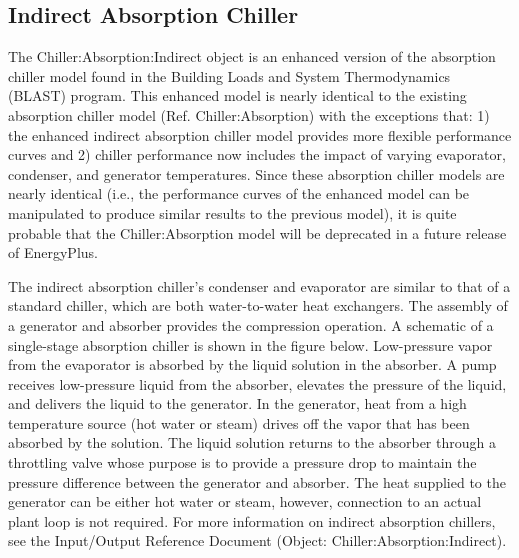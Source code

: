 \subsection{Indirect Absorption Chiller}\label{indirect-absorption-chiller}

The Chiller:Absorption:Indirect object is an enhanced version of the absorption chiller model found in the Building Loads and System Thermodynamics (BLAST) program. This enhanced model is nearly identical to the existing absorption chiller model (Ref. Chiller:Absorption) with the exceptions that: 1) the enhanced indirect absorption chiller model provides more flexible performance curves and 2) chiller performance now includes the impact of varying evaporator, condenser, and generator temperatures. Since these absorption chiller models are nearly identical (i.e., the performance curves of the enhanced model can be manipulated to produce similar results to the previous model), it is quite probable that the Chiller:Absorption model will be deprecated in a future release of EnergyPlus.

The indirect absorption chiller's condenser and evaporator are similar to that of a standard chiller, which are both water-to-water heat exchangers. The assembly of a generator and absorber provides the compression operation. A schematic of a single-stage absorption chiller is shown in the figure below. Low-pressure vapor from the evaporator is absorbed by the liquid solution in the absorber. A pump receives low-pressure liquid from the absorber, elevates the pressure of the liquid, and delivers the liquid to the generator. In the generator, heat from a high temperature source (hot water or steam) drives off the vapor that has been absorbed by the solution. The liquid solution returns to the absorber through a throttling valve whose purpose is to provide a pressure drop to maintain the pressure difference between the generator and absorber. The heat supplied to the generator can be either hot water or steam, however, connection to an actual plant loop is not required. For more information on indirect absorption chillers, see the Input/Output Reference Document (Object: Chiller:Absorption:Indirect).

